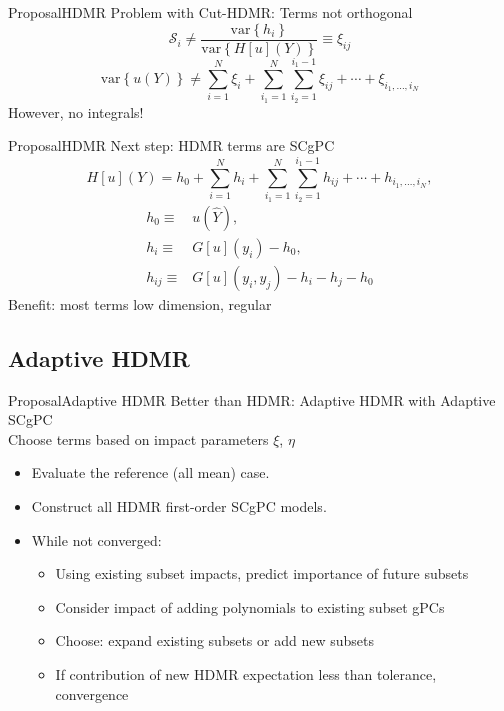 \documentclass{beamer}
\begin{document}
\begin{frame}{Proposal}{HDMR}\vspace{-20pt}
  Problem with Cut-HDMR: Terms not orthogonal
  \begin{equation*}
    \mathcal{S}_i \neq \frac{\text{var}\left\{h_i\right\}}{\text{var}\left\{H[u](Y)\right\}}\equiv\xi_{ij} 
  \end{equation*}
  \begin{equation*}
    \text{var}\left\{u(Y)\right\}\neq \sum_{i=1}^N \xi_i + \sum_{i_1=1}^N\sum_{i_2=1}^{i_1-1}
         \xi_{ij}+\cdots+\xi_{i_1,\ldots,i_N}
  \end{equation*}
  However, no integrals!
\end{frame}

\begin{frame}{Proposal}{HDMR}\vspace{-20pt}
  Next step: HDMR terms are SCgPC
  \begin{equation*}
  H[u](Y) = h_0 + \sum_{i=1}^N h_i + \sum_{i_1=1}^N\sum_{i_2=1}^{i_1-1}h_{ij}+\cdots +
      h_{i_1,\ldots,i_N},
  \end{equation*}
  \begin{align*}
    h_0 \equiv& u(\hat Y), \\
    h_i \equiv& G[u](y_i) - h_0, \\
    h_{ij} \equiv& G[u](y_i,y_j) -h_i - h_j - h_0
  \end{align*}
  Benefit: most terms low dimension, regular
\end{frame}

\subsection{Adaptive HDMR}
\begin{frame}{Proposal}{Adaptive HDMR}\vspace{-20pt}
  Better than HDMR: Adaptive HDMR with Adaptive SCgPC\\
  Choose terms based on impact parameters $\xi$, $\eta$
\begin{itemize}
  \item Evaluate the reference (all mean) case.
  \item Construct all HDMR first-order SCgPC models.
  \item While not converged:
  \begin{itemize}
    \item Using existing subset impacts, predict importance of future subsets
    \item Consider impact of adding polynomials to existing subset gPCs
    \item Choose: expand existing subsets or add new subsets
    \item If contribution of new HDMR expectation less than tolerance, convergence
  \end{itemize}
\end{itemize}
\end{frame}
\end{document}
